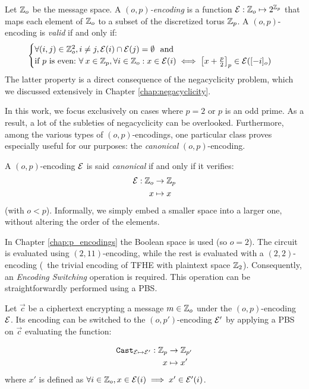 \begin{definition}[$(o, p)$-encoding]
	Let $\mathbb{Z}_o$ be the message space. A \emph{$(o, p)$-encoding} is a function $\mathcal{E}: \mathbb{Z}_o \mapsto 2^{\mathbb{Z}_p}$ that maps each element of $\mathbb{Z}_o$ to a subset of the discretized torus $\mathbb{Z}_p$. A $(o, p)$-encoding is \emph{valid} if and only if:
	\begin{equation}
		\begin{cases}
			\forall (i, j) \in \mathbb{Z}_o^2, i \ne j, \mathcal{E}(i) \cap \mathcal{E}(j) = \emptyset~\text{ and}\\
			\text{if $p$ is even:} ~\forall \:x \in \mathbb Z_p, \forall i \in \mathbb{Z}_o: x \in \mathcal{E}(i) \iff \left [ x + \frac p 2 \right ]_p \in \mathcal{E}([-i]_o)
		\end{cases}
	\end{equation}
	The latter property is a direct consequence of the negacyclicity problem, which we discussed extensively in Chapter \ref{chap:negacyclicity}.
	\label{def:hippogryph_encoding}
\end{definition}

In this work, we focus exclusively on cases where $p=2$ or $p$ is an odd prime. As a result, a lot of the subleties of negacyclicity can be overlooked. Furthermore, among the various types of $(o, p)$-encodings, one particular class proves especially useful for our purposes: the \textit{canonical} $(o, p)$-encoding.

\begin{definition}
	\label{def:canonical-encoding}
	A $(o, p)$-encoding $\mathcal{E}$ is said \textit{canonical} if and only if it verifies: 
	\begin{align*}
		\mathcal{E}: \mathbb{Z}_o &\rightarrow \mathbb{Z}_p\\
		x &\mapsto x
	\end{align*}
	(with $o < p$). Informally, we simply embed a smaller space into a larger one, without altering the order of the elements.
\end{definition}


In Chapter \ref{chap:p_encodings} the Boolean space is used (so $o=2$). The \SubBytes circuit is evaluated using $(2,11)$-encoding, while the rest is evaluated with a $(2, 2)$-encoding (\ie~the trivial encoding of \gls{TFHE} with plaintext space $\mathbb{Z}_2$). Consequently, an \textit{Encoding Switching} operation is required. This operation can be straightforwardly performed using a \gls{PBS}.

\begin{definition}
	\label{def:encoding-switching}
	Let $\vec c$ be a ciphertext encrypting a message $m \in \mathbb{Z}_o$ under the $(o, p)$-encoding $\mathcal{E}$. Its encoding can be switched to the $(o, p')$-encoding $\mathcal{E}'$ by applying a \gls{PBS} on $\vec c$ evaluating the function:
	
	\begin{align*}
		\texttt{Cast}_{\mathcal{E} \mapsto \mathcal{E}'}: \mathbb{Z}_p &\rightarrow \mathbb{Z}_{p'}\\
		x &\mapsto x'
	\end{align*}
	where $x'$ is defined as $\forall i \in \mathbb{Z}_o, x \in \mathcal{E}(i) \implies x' \in \mathcal{E}'(i)$.
\end{definition}


